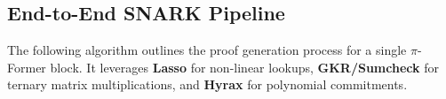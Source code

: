 \documentclass{article}
\newcommand{\ZZ}{\mathbb{Z}}          %
\newcommand{\bx}{\mathbf{x}}
\newcommand{\bbeta}{\mathbf{\beta}}
\newcommand{\bgamma}{\mathbf{\gamma}}
\begin{document}



\subsection{End-to-End SNARK Pipeline}
\label{subsec:circuit}

The following algorithm outlines the proof generation process for a single $\pi$-Former block. It leverages \textbf{Lasso} for non-linear lookups, \textbf{GKR/Sumcheck} for ternary matrix multiplications, and \textbf{Hyrax} for polynomial commitments.
\end{document}
